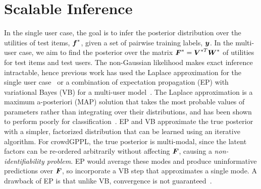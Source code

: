 \section{Scalable Inference}\label{sec:inf}

In the single user case, the goal is to infer the posterior distribution over the utilities of test items, $\boldsymbol f^*$, 
given a set of pairwise training labels, $\boldsymbol y$. In the multi-user case, we aim to find the posterior over the matrix
$\boldsymbol F^*=\boldsymbol V^{*T} \boldsymbol W^*$ of utilities for test items and test users.
The non-Gaussian likelihood makes exact inference intractable, hence previous work has used
 the Laplace approximation for the single user case~\citep{chu2005preference}
or a combination of expectation propagation (EP) with variational Bayes (VB) for a 
multi-user model~\citep{houlsby2012collaborative}.
The Laplace approximation is a maximum a-posteriori (MAP) solution that
takes the most probable values of parameters rather than integrating over their distributions,
and has been shown to perform poorly for classification~\citep{nickisch2008approximations}. 
EP and VB approximate the true posterior with a simpler, factorized distribution
that can be learned using an iterative algorithm.
For crowdGPPL, the true posterior is multi-modal, since the latent factors can be re-ordered arbitrarily without
affecting $\boldsymbol F$, causing a \emph{non-identifiability problem}.
EP would average these modes and produce uninformative predictions over $\boldsymbol F$, so
\citet{houlsby2012collaborative} incorporate a VB step that approximates a single mode.
A drawback of EP is that unlike VB, convergence is not guaranteed~\citep{minka2001expectation}.

